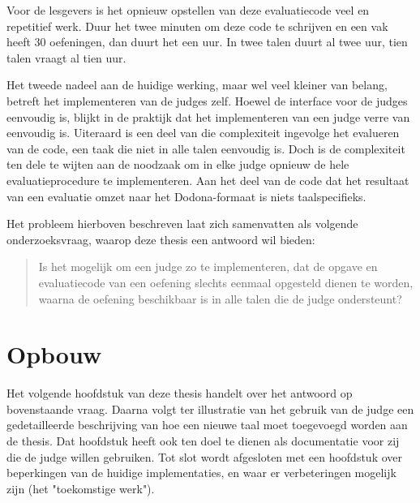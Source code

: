 Voor de lesgevers is het opnieuw opstellen van deze evaluatiecode veel en repetitief werk.
Duur het twee minuten om deze code te schrijven en een vak heeft 30 oefeningen, dan duurt het een uur.
In twee talen duurt al twee uur, tien talen vraagt al tien uur.

Het tweede nadeel aan de huidige werking, maar wel veel kleiner van belang, betreft het implementeren van de judges zelf.
Hoewel de interface voor de judges eenvoudig is, blijkt in de praktijk dat het implementeren van een judge verre van eenvoudig is.
Uiteraard is een deel van die complexiteit ingevolge het evalueren van de code, een taak die niet in alle talen eenvoudig is.
Doch is de complexiteit ten dele te wijten aan de noodzaak om in elke judge opnieuw de hele evaluatieprocedure te implementeren.
Aan het deel van de code dat het resultaat van een evaluatie omzet naar het Dodona-formaat is niets taalspecifieks.

Het probleem hierboven beschreven laat zich samenvatten als volgende onderzoeksvraag, waarop deze thesis een antwoord wil bieden:

\begin{quote}
    Is het mogelijk om een judge zo te implementeren, dat de opgave en evaluatiecode van een oefening slechts eenmaal opgesteld dienen te worden, waarna de oefening beschikbaar is in alle talen die de judge ondersteunt?
\end{quote}

\section{Opbouw}\label{sec:opbouw}

Het volgende hoofdstuk van deze thesis handelt over het antwoord op bovenstaande vraag.
Daarna volgt ter illustratie van het gebruik van de judge een gedetailleerde beschrijving van hoe een nieuwe taal moet toegevoegd worden aan de thesis.
Dat hoofdstuk heeft ook ten doel te dienen als documentatie voor zij die de judge willen gebruiken.
Tot slot wordt afgesloten met een hoofdstuk over beperkingen van de huidige implementaties, en waar er verbeteringen mogelijk zijn (het "toekomstige werk").
